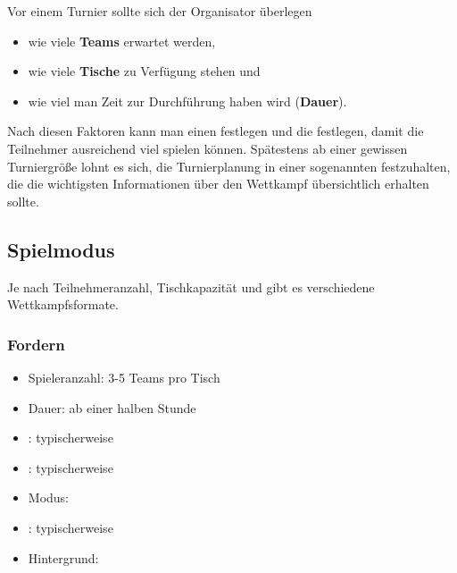 Vor einem Turnier sollte sich der Organisator überlegen
\begin{itemize}
\item wie viele {\bf Teams} erwartet werden, 
\item wie viele {\bf Tische} zu Verfügung stehen und
\item wie viel man Zeit zur Durchführung haben wird ({\bf Dauer}).
\end{itemize}
Nach diesen Faktoren kann man einen  festlegen und die  festlegen, damit die Teilnehmer ausreichend viel spielen können. 
Spätestens ab einer gewissen Turniergröße lohnt es sich, die Turnierplanung in einer sogenannten  festzuhalten, die die wichtigsten Informationen über den Wettkampf übersichtlich erhalten sollte.

\subsection{Spielmodus}
\label{turniere:vorbereitung:modus}

Je nach Teilnehmeranzahl, Tischkapazität und
gibt es verschiedene Wettkampfsformate.



\subsubsection{Fordern}
\label{turniere:vorbereitung:modus:fordern}

\begin{itemize}
\item Spieleranzahl: 3-5 Teams pro Tisch
\item Dauer: ab einer halben Stunde
\item {}: typischerweise  
\item {}: typischerweise 
\item Modus: 
\item {}:
typischerweise  
\item Hintergrund:
\end{itemize}


